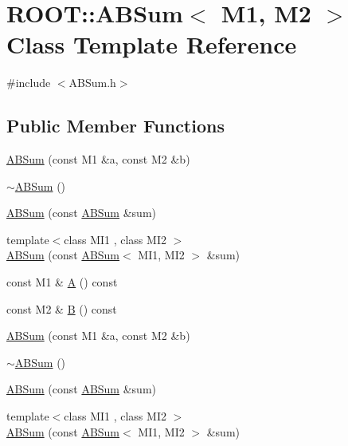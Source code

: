 \hypertarget{classROOT_1_1Minuit2_1_1ABSum}{}\section{R\+O\+OT\+:\+:A\+B\+Sum$<$ M1, M2 $>$ Class Template Reference}
\label{classROOT_1_1Minuit2_1_1ABSum}


{\ttfamily \#include $<$A\+B\+Sum.\+h$>$}

\subsection*{Public Member Functions}
\begin{DoxyCompactItemize}
\item 
\mbox{\hyperlink{classROOT_1_1Minuit2_1_1ABSum_adaac8ec05b73e9e86e736faab9a685fe}{A\+B\+Sum}} (const M1 \&a, const M2 \&b)
\item 
\mbox{\hyperlink{classROOT_1_1Minuit2_1_1ABSum_ab2d4441bcbcb38be86091d5eda7b63b2}{$\sim$\+A\+B\+Sum}} ()
\item 
\mbox{\hyperlink{classROOT_1_1Minuit2_1_1ABSum_ae687b46f660f6db5ca9c4626fd5e5a4b}{A\+B\+Sum}} (const \mbox{\hyperlink{classROOT_1_1Minuit2_1_1ABSum}{A\+B\+Sum}} \&sum)
\item 
{\footnotesize template$<$class M\+I1 , class M\+I2 $>$ }\\\mbox{\hyperlink{classROOT_1_1Minuit2_1_1ABSum_a4f9776ad68bfb91ccf613b367ecf6730}{A\+B\+Sum}} (const \mbox{\hyperlink{classROOT_1_1Minuit2_1_1ABSum}{A\+B\+Sum}}$<$ M\+I1, M\+I2 $>$ \&sum)
\item 
const M1 \& \mbox{\hyperlink{classROOT_1_1Minuit2_1_1ABSum_a079b47b55709bd81d820c277aa389b4f}{A}} () const
\item 
const M2 \& \mbox{\hyperlink{classROOT_1_1Minuit2_1_1ABSum_a6370bd6e7593778d1933ef761dad2449}{B}} () const
\item 
\mbox{\hyperlink{classROOT_1_1Minuit2_1_1ABSum_adaac8ec05b73e9e86e736faab9a685fe}{A\+B\+Sum}} (const M1 \&a, const M2 \&b)
\item 
\mbox{\hyperlink{classROOT_1_1Minuit2_1_1ABSum_ab2d4441bcbcb38be86091d5eda7b63b2}{$\sim$\+A\+B\+Sum}} ()
\item 
\mbox{\hyperlink{classROOT_1_1Minuit2_1_1ABSum_ae687b46f660f6db5ca9c4626fd5e5a4b}{A\+B\+Sum}} (const \mbox{\hyperlink{classROOT_1_1Minuit2_1_1ABSum}{A\+B\+Sum}} \&sum)
\item 
{\footnotesize template$<$class M\+I1 , class M\+I2 $>$ }\\\mbox{\hyperlink{classROOT_1_1Minuit2_1_1ABSum_a4f9776ad68bfb91ccf613b367ecf6730}{A\+B\+Sum}} (const \mbox{\hyperlink{classROOT_1_1Minuit2_1_1ABSum}{A\+B\+Sum}}$<$ M\+I1, M\+I2 $>$ \&sum)

\end{DoxyCompactItemize}
